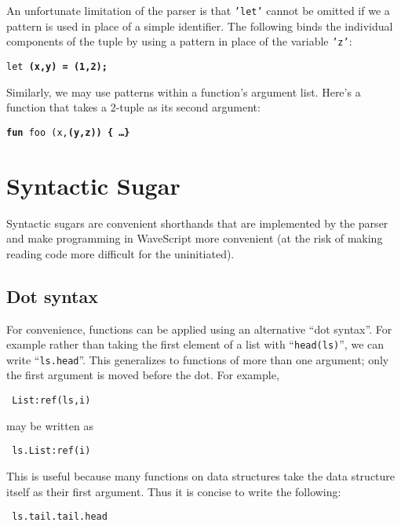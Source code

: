 \documentclass[twocolumn]{report}
\newcommand{\cd}{\tt}
\newenvironment{wscode}{\begin{center}\tt}{\end{center}}
\begin{document}
An unfortunate limitation of the parser is that {\tt 'let'} cannot be
omitted if we a pattern is used in place of a simple identifier.  The
following binds the individual components of the tuple by using a
pattern in place of the variable {\tt 'z'}:
\begin{center}
{\tt let \bf{(x,y)} = (1,2);}
\end{center}

Similarly, we may use patterns within a function's argument list.  Here's
a function that takes a 2-tuple as its second argument:

\begin{center}
{\tt {\bf fun} foo (x,\bf{(y,z)}) \{ \dots \}}
\end{center}


\section{Syntactic Sugar}

Syntactic sugars are convenient shorthands that are implemented by the
parser and make programming in WaveScript more convenient (at the risk
of making reading code more difficult for the uninitiated).

\subsection{Dot syntax}
  For convenience, functions can be applied using an
alternative ``dot syntax''.  For example rather than taking the first
element of a list with ``{\cd head(ls)}'', we can write ``{\cd ls.head}''.
This generalizes to functions of more than one argument; only the
first argument is moved before the dot.  For example, 
\vspace{-2mm}
\begin{wscode}
List:ref(ls,i)
\end{wscode}
\vspace{-2mm}
 may be written as 
\vspace{-2mm}
\begin{wscode}
ls.List:ref(i)
\end{wscode}
\vspace{-2mm}
This is useful because many functions on data structures take the
data structure itself as their first argument.  Thus it is concise to
write the following:
\vspace{-2mm}
\begin{wscode}
ls.tail.tail.head
\end{wscode}
\vspace{-2mm}
\end{document}
